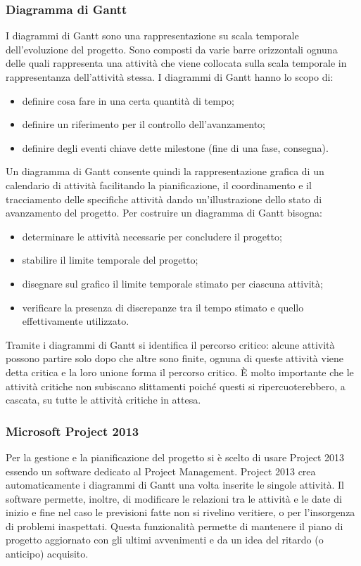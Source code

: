 \subsubsection{Diagramma di Gantt}

I diagrammi di Gantt sono una rappresentazione su scala temporale dell'evoluzione del
progetto. Sono composti da varie barre orizzontali ognuna delle quali rappresenta una
attività che viene collocata sulla scala temporale in rappresentanza dell'attività stessa.
I diagrammi di Gantt hanno lo scopo di:
\begin{itemize}
\item definire cosa fare in una certa quantità di tempo;
\item definire un riferimento per il controllo dell'avanzamento;
\item  definire degli eventi chiave dette milestone (fine di una fase, consegna).
\end{itemize}
Un diagramma di Gantt consente quindi la rappresentazione grafica di un calendario di
attività facilitando la pianificazione, il coordinamento e il tracciamento delle specifiche
attività dando un'illustrazione dello stato di avanzamento del progetto. Per costruire
un diagramma di Gantt bisogna:
\begin{itemize}
\item  determinare le attività necessarie per concludere il progetto;
\item  stabilire il limite temporale del progetto;
\item  disegnare sul grafico il limite temporale stimato per ciascuna attività;
\item  verificare la presenza di discrepanze tra il tempo stimato e quello effettivamente
utilizzato.
\end{itemize}
Tramite i diagrammi di Gantt si identifica il percorso critico: alcune attività possono
partire solo dopo che altre sono finite, ognuna di queste attività viene detta critica e la
loro unione forma il percorso critico. È molto importante che le attività critiche non
subiscano slittamenti poiché questi si ripercuoterebbero, a cascata, su tutte le attività
critiche in attesa.

\subsubsection{Microsoft Project 2013}
Per la gestione e la pianificazione del progetto si è scelto di usare Project 2013 essendo
un software dedicato al Project Management. Project 2013 
crea automaticamente i diagrammi di Gantt una volta inserite le singole attività. Il software permette, inoltre, di modificare
le relazioni tra le attività e le date di inizio e fine nel caso le previsioni fatte non si
rivelino veritiere, o per l'insorgenza di problemi inaspettati. Questa funzionalità
permette di mantenere il piano di progetto aggiornato con gli ultimi avvenimenti e da
un idea del ritardo (o anticipo) acquisito.

